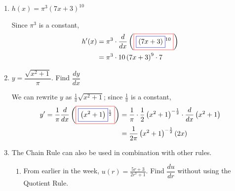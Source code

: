 \documentclass{article}
\begin{document}
\begin{enumerate}
\begin{enumerate}
  \item
    \begin{problem}[\vfill]
     $h(x) = \pi^3 (7x + 3)^{10}$
    \end{problem}

    \begin{solution}
      Since $\pi^3$ is a constant,
      \begin{align*}
        h'(x) = {} & \pi ^3\cdot \frac{d}{dx} \left(\fcolorbox{red}{white}{$\displaystyle \fcolorbox{blue}{white}{$\displaystyle  \left(7 x+ 3\right)$}^ { 10} $}\right) \\
        = {} & \pi ^3\cdot 10 \left(7 x+ 3\right)^ { 9} \cdot 7
      \end{align*}
    \end{solution}

  \item
    \begin{problem}[\stretch{0.5}]
      $y = \dfrac{\sqrt{x^2 + 1}}{\pi}$. Find $\dfrac{dy}{dx}$
    \end{problem}

    \begin{solution}
      We can rewrite $y$ as $\frac{1}{\pi} \sqrt{x^2 + 1}$; since
      $\frac{1}{\pi}$ is a constant,
      \begin{align*}
        y' = {} \frac{1}{\pi} \frac{d}{dx}
        \left(\fcolorbox{red}{white}{$\displaystyle
            \fcolorbox{blue}{white}{$\displaystyle  \left(x^2 + 1
              \right)$}^ { \frac{1}{2}} $}\right) = {} & \frac{1}{\pi} \cdot
        \frac{1}{2}
        \left(x^2 + 1 \right)^ { -\frac{1}{2}} \cdot
        \frac{d}{dx}\left(x^2 + 1 \right) \\ 
        = {} & \frac{1}{2\pi} \left(x^2 + 1 \right)^ { -\frac{1}{2}}
        \left(2x \right) 
      \end{align*}
    \end{solution}

  \item

    \begin{problem}[]
      The Chain Rule can also be used in combination with other rules.
      \end{problem}
      \begin{enumerate}
          \item
   \begin{problem}[\vfill]
      From earlier in the week, $\displaystyle u(r) = \frac{5r + 3}{2r^7 + 1}$. Find $\dfrac{du}{dr}$ without using the Quotient Rule.
    \end{problem}


\end{enumerate}
\end{enumerate}
\end{enumerate}
\end{document}
